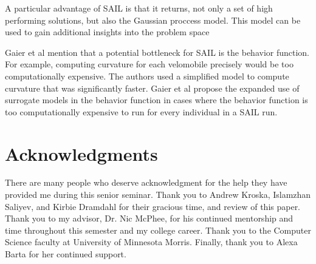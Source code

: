 \documentclass{sig-alternate}
\begin{document}
A particular advantage of SAIL is that it returns, not only a set of high performing solutions, but also the Gaussian proccess model.
This model can be used to gain additional insights into the problem space

Gaier et al mention that a potential bottleneck for SAIL is the behavior function.
For example, computing curvature for each velomobile precisely would be too computationally expensive.
The authors used a simplified model to compute curvature that was significantly faster.
Gaier et al propose the expanded use of surrogate models in the behavior function in cases where the behavior function is too computationally expensive to run for every individual in a SAIL run.

\section*{Acknowledgments}
There are many people who deserve acknowledgment for the help they have provided me during this senior seminar. Thank you to Andrew Kroska, Islamzhan Saliyev, and Kirbie Dramdahl for their gracious time, and review of this paper.
Thank you to my advisor, Dr. Nic McPhee, for his continued mentorship and time throughout this semester and my college career.
Thank you to the Computer Science faculty at University of Minnesota Morris.
Finally, thank you to Alexa Barta for her continued support.
\label{sec:acknowledgments}


  
\end{document}
